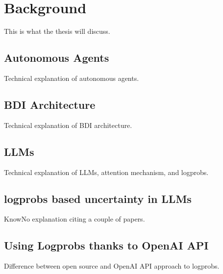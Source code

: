 \chapter{Background}

This is what the thesis will discuss.

\section{Autonomous Agents}
Technical explanation of autonomous agents.
\section{BDI Architecture}
Technical explanation of BDI architecture.
\section{LLMs}
Technical explanation of LLMs, attention mechanism, and logprobs.
\section{logprobs based uncertainty in LLMs}
KnowNo explanation citing a couple of papers.
\section{Using Logprobs thanks to OpenAI API}
Difference between open source and OpenAI API approach to logprobs.